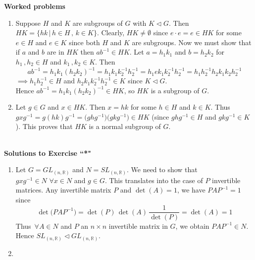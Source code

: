 \documentclass[11pt,a4paper]{article}
\theoremstyle{definition}
\begin{document}
\textbf{Worked problems}
\begin{enumerate}
\item[(i)] Suppose $H$ and $K$ are subgroups of $G$ with $K\vartriangleleft G$. Then $HK = \{hk\, |\, h\in H\, ,\, k\in K\}$.
Clearly, $HK\neq \emptyset$ since $e\cdot e = e\in HK$ for some $e\in H$ and $e\in K$  since both $H$ and $K$ are subgroups. Now we must show that if $a$ and $b$ are in $HK$ then $ab^{-1}\in HK$. Let $a = h_1k_1$ and $b = h_2k_2$ for  $h_1\, , h_2\in H$ and $k_1\, , k_2\in K$. Then $$ab^{-1} = h_1k_1(h_2k_2)^{-1} = h_1k_1k_2^{-1}h_2^{-1} = h_1ek_1k_2^{-1}h_2^{-1} = h_1h_2^{-1}h_2k_1k_2h_2^{-1}$$ 
$\implies h_1h_2^{-1}\in H$ and $h_2k_1k_2^{-1}h_2^{-1}\in K$ since $K\vartriangleleft G$.\\ Hence $ab^{-1} = h_1k_1(h_2k_2)^{-1}\in HK$, so $HK$ is a subgroup of $G$.


\item[(ii)] Let $g\in G$ and $x\in HK$. Then $x = hk$ for some $h\in H$ and $k\in K$. Thus\\ $gxg^{-1} = g(hk)g^{-1} = \big(ghg^{-1}\big)\big(gkg^{-1}\big)\in HK$ (since $ghg^{-1} \in H$ and $gkg^{-1}\in K$). This proves that $HK$ is a normal subgroup of $G$.\\\\
\end{enumerate}








\textbf{Solutions to Exercise ``*"}
\begin{enumerate}
\item[(a)] Let $G = GL_{(n,\mathbb{R})}$ and $N = SL_{(n,\mathbb{R})}$. We need to show that $gxg^{-1}\in N\,\, \forall x\in N$ and $g\in G$. This translates into the case of $P$ invertible matrices. Any invertible matrix $P$ and $\det (A) = 1$, we have $PAP^{-1} = 1\, \,$ since $$\det \big(PAP^{-1}\big) = \det (P)\, \det (A)\, \dfrac{1}{\det (P)} = \det (A) = 1$$
Thus $\, \forall A\in N$ and $P$ an $n\times n$ invertible matrix in $G$, we obtain $PAP^{-1}\in N$. Hence $SL_{(n,\mathbb{R})}\vartriangleleft GL_{(n,\mathbb{R})}$.\\

\item[(b).]
\end{enumerate}


\vspace{4cm}
\end{document}

